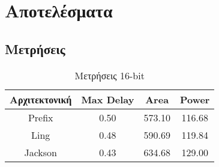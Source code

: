 \section{Αποτελέσματα}

\subsection{Μετρήσεις}

\begin{table}[ht]
\centering
     \begin{tabular}{||c | c  c  c ||} 
        \hline
        Αρχιτεκτονική & Max Delay & Area & Power \\ [0.5ex] 
        \hline\hline
        Prefix  & 0.50  & 573.10    & 116.68 \\ 
        \hline
        Ling    & 0.48  & 590.69    & 119.84 \\
        \hline
        Jackson & 0.43  & 634.68    & 129.00 \\
        \hline
    \end{tabular}
\caption{Μετρήσεις 16-bit}
\label{}
\end{table}



